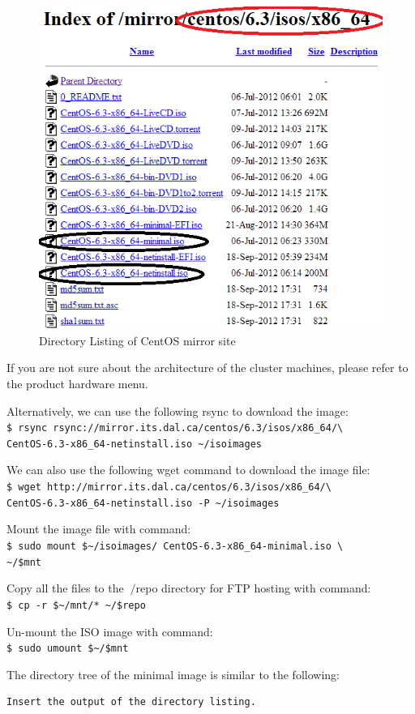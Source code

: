 \begin{figure}[h]
  \centering
  \includegraphics[width=.6\textwidth]{figs/5163OS_02_02.png}
  \caption{Directory Listing of CentOS mirror site}\label{fig:centos.mirror}
\end{figure} 

If you are not sure about the architecture of the cluster machines, please refer to the product hardware menu.

Alternatively, we can use the following rsync to download the image: \\
\verb|$ rsync rsync://mirror.its.dal.ca/centos/6.3/isos/x86_64/\| \\
\verb|CentOS-6.3-x86_64-netinstall.iso ~/isoimages|

We can also use the following wget command to download the image file: \\
\verb|$ wget http://mirror.its.dal.ca/centos/6.3/isos/x86_64/\| \\
\verb|CentOS-6.3-x86_64-netinstall.iso -P ~/isoimages|

Mount the image file with command: \\
\verb|$ sudo mount $~/isoimages/ CentOS-6.3-x86_64-minimal.iso \| \\
\verb|~/$mnt|

Copy all the files to the $~/$repo directory for FTP hosting with command: \\
\verb|$ cp -r $~/mnt/* ~/$repo|

Un-mount the ISO image with command: \\
\verb|$ sudo umount $~/$mnt|

The directory tree of the minimal image is similar to the following:
\begin{verbatim}
Insert the output of the directory listing.
\end{verbatim}

